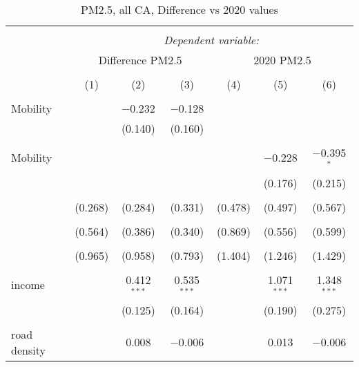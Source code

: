 
\begin{table}[!htbp] \centering 
  \caption{PM2.5, all CA, Difference vs 2020 values} 
  \label{} 
\begin{tabular}{@{\extracolsep{5pt}}lcccccc} 
\\[-1.8ex]\hline 
\hline \\[-1.8ex] 
 & \multicolumn{6}{c}{\textit{Dependent variable:}} \\ 
\cline{2-7} 
 & \multicolumn{3}{c}{Difference PM2.5} & \multicolumn{3}{c}{2020 PM2.5} \\ 
\\[-1.8ex] & (1) & (2) & (3) & (4) & (5) & (6)\\ 
\hline \\[-1.8ex] 
 Mobility &  & $-$0.232 & $-$0.128 &  &  &  \\ 
  &  & (0.140) & (0.160) &  &  &  \\ 
  & & & & & & \\ 
 Mobility &  &  &  &  & $-$0.228 & $-$0.395$^{*}$ \\ 
  &  &  &  &  & (0.176) & (0.215) \\ 
  & & & & & & \\ 
  & (0.268) & (0.284) & (0.331) & (0.478) & (0.497) & (0.567) \\ 
  & & & & & & \\ 
  & (0.564) & (0.386) & (0.340) & (0.869) & (0.556) & (0.599) \\ 
  & & & & & & \\ 
  & (0.965) & (0.958) & (0.793) & (1.404) & (1.246) & (1.429) \\ 
  & & & & & & \\ 
 income &  & 0.412$^{***}$ & 0.535$^{***}$ &  & 1.071$^{***}$ & 1.348$^{***}$ \\ 
  &  & (0.125) & (0.164) &  & (0.190) & (0.275) \\ 
  & & & & & & \\ 
 road density &  & 0.008 & $-$0.006 &  & 0.013 & $-$0.006 \\ 

\end{tabular}
\end{table}
